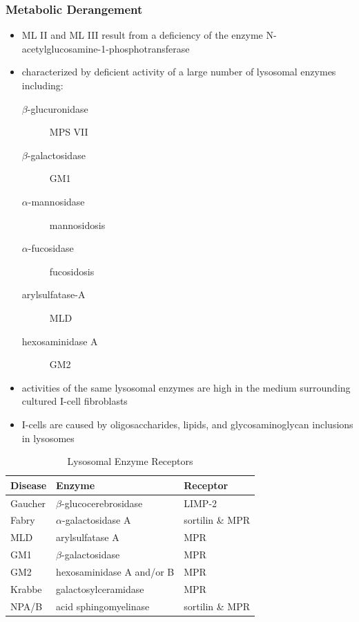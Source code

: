 \documentclass[12pt]{scrartcl}
\begin{document}
\subsubsection{Metabolic Derangement}
\label{sec:org5a04c6f}
\begin{itemize}
\item ML II and ML III result from a deficiency of the enzyme
N-acetylglucosamine-1-phosphotransferase

\item characterized by deficient activity of a large number of lysosomal enzymes including:
\begin{description}
\item[{\(\beta\)-glucuronidase}] MPS VII
\item[{\(\beta\)-galactosidase}] GM1
\item[{\(\alpha\)-mannosidase}] mannosidosis
\item[{\(\alpha\)-fucosidase}] fucosidosis
\item[{arylsulfatase-A}] MLD
\item[{hexosaminidase A}] GM2
\end{description}
\item activities of the same lysosomal enzymes are high in the medium
surrounding cultured I-cell fibroblasts

\item I-cells are caused by oligosaccharides, lipids, and
glycosaminoglycan inclusions in lysosomes
\end{itemize}

\begin{table}[htbp]
\caption{\label{tab:org1fd7ab1}Lysosomal Enzyme Receptors}
\centering
\begin{tabular}{lll}
Disease & Enzyme & Receptor\\
\hline
Gaucher & \(\beta\)-glucocerebrosidase & LIMP-2\\
Fabry & \(\alpha\)-galactosidase A & sortilin \& MPR\\
MLD & arylsulfatase A & MPR\\
GM1 & \(\beta\)-galactosidase & MPR\\
GM2 & hexosaminidase A and/or B & MPR\\
Krabbe & galactosylceramidase & MPR\\
NPA/B & acid sphingomyelinase & sortilin \& MPR\\
\end{tabular}
\end{table}
\end{document}
